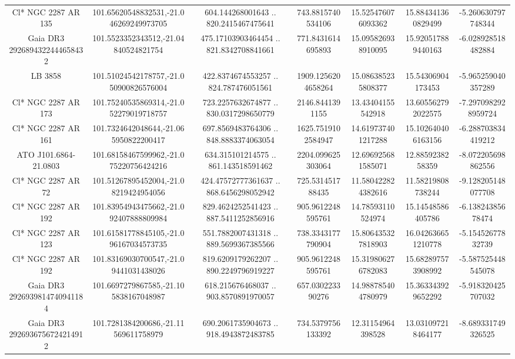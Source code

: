 \begin{table}
\begin{tabular}{ccccccc}
Cl* NGC 2287     AR     135 & 101.65620548832531,-21.046269249973705 & 604.144268001643 .. 820.2415467475641 & 743.8815740534106 & 15.525476076093362 & 15.884341360829499 & -5.260630797748344 \\
Gaia DR3 2926894322444658432 & 101.5523352343512,-21.04840524821754 & 475.17103903464454 .. 821.8342708841661 & 771.8431614695893 & 15.095826938910095 & 15.920517889440163 & -6.028928518482884 \\
LB  3858 & 101.51024542178757,-21.050900826576004 & 422.8374674553257 .. 824.787476051561 & 1909.1256204658264 & 15.086385235808377 & 15.54306904173453 & -5.965259040357289 \\
Cl* NGC 2287     AR     173 & 101.75240535869314,-21.052279019718757 & 723.2257632674877 .. 830.0317298650779 & 2146.8441391155 & 13.43404155542918 & 13.605562792022575 & -7.2970982928959724 \\
Cl* NGC 2287     AR     161 & 101.7324642048644,-21.065950822200417 & 697.8569483764306 .. 848.8883374063054 & 1625.7519102584947 & 14.619737401217288 & 15.102640406163156 & -6.288703834419212 \\
ATO J101.6864-21.0803 & 101.68158467599962,-21.075220756424216 & 634.315101214575 .. 861.143518591462 & 2204.099625303064 & 12.696925681585071 & 12.8859238258359 & -8.072205698862556 \\
Cl* NGC 2287     AR      72 & 101.51267895452004,-21.08219424954056 & 424.47572777361637 .. 868.6456298052942 & 725.531451788435 & 11.580422824382616 & 11.58219808738244 & -9.128205148077708 \\
Cl* NGC 2287     AR     192 & 101.83954943475662,-21.092407888809984 & 829.4624252541423 .. 887.5411252856916 & 905.9612248595761 & 14.78593110524974 & 15.14548586405786 & -6.13824385678474 \\
Cl* NGC 2287     AR     123 & 101.61581778845105,-21.096167034573735 & 551.7882007431318 .. 889.5699367385566 & 738.3343177790904 & 15.806435327818903 & 16.042636651210778 & -5.15452677832739 \\
Cl* NGC 2287     AR     192 & 101.83169030700547,-21.09441031438026 & 819.6209179262207 .. 890.2249796919227 & 905.9612248595761 & 15.319806276782083 & 15.682897573908992 & -5.587525448545078 \\
Gaia DR3 2926939814740941184 & 101.6697279867585,-21.105838167048987 & 618.215676468037 .. 903.8570891970057 & 657.030223390276 & 14.988785404780979 & 15.363343929652292 & -5.918320425707032 \\
Gaia DR3 2926936756724214912 & 101.7281384200686,-21.11569611758979 & 690.2061735904673 .. 918.4943872483785 & 734.5379756133392 & 12.31154964398528 & 13.031097218464177 & -8.689331749326525 \\

\end{tabular}
\end{table}
